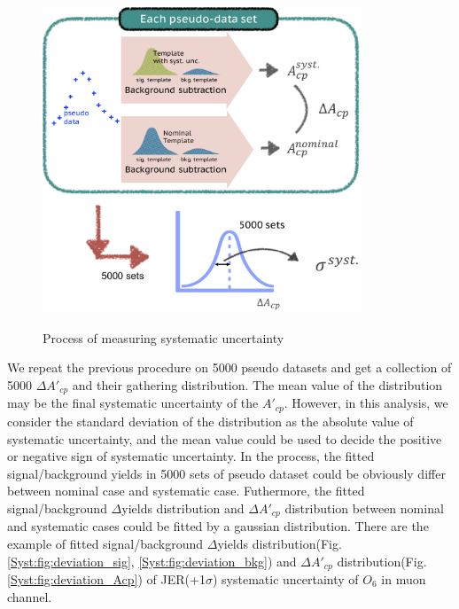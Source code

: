 		\begin{figure}[H]
		\centering{}
	    	\includegraphics[width=0.85\textwidth]{Figures/SystUnc/approach_syst.pdf}\\
		\caption{Process of measuring systematic uncertainty}
		\label{Syst:fig:approach}
		\end{figure}
		\FloatBarrier

		We repeat the previous procedure on 5000 pseudo datasets and get a collection of 5000 $\Delta A'_{cp}$ and their gathering distribution. The mean value of the distribution may be the final systematic uncertainty of the $A'_{cp}$. However, in this analysis, we consider the standard deviation of the distribution as the absolute value of systematic uncertainty, and the mean value could be used to decide the positive or negative sign of systematic uncertainty. In the process, the fitted signal/background yields in 5000 sets of pseudo dataset could be obviously differ between nominal case and systematic case. Futhermore, the fitted signal/background $\Delta$yields distribution and $\Delta A'_{cp}$ distribution between nominal and systematic cases could be fitted by a gaussian distribution. There are the example of fitted signal/background $\Delta$yields distribution(Fig.\ref{Syst:fig:deviation_sig}, \ref{Syst:fig:deviation_bkg}) and $\Delta A'_{cp}$ distribution(Fig.\ref{Syst:fig:deviation_Acp}) of JER(+1$\sigma$) systematic uncertainty of $O_6$ in muon channel.


